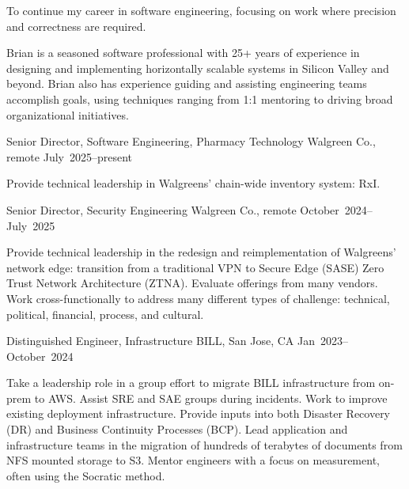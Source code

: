 \documentclass{resume}
\begin{document}
\begin{resume}
\begin{Objective}
To continue my career in software engineering, focusing on work where precision and correctness are required. 
\end{Objective}

\begin{Profile}
Brian is a seasoned software professional with 25+ years of experience
in designing and implementing horizontally scalable systems in Silicon
Valley and beyond. Brian also has experience guiding and assisting
engineering teams accomplish goals, using techniques ranging from 1:1
mentoring to driving broad organizational initiatives.
\end{Profile}

\begin{Employment}
\begin{job}{Senior Director, Software Engineering, Pharmacy Technology}
           {Walgreen Co., remote}
           {July~2025--present}

Provide technical leadership in Walgreens' chain-wide inventory system: RxI.
           
\end{job}

\begin{job}{Senior Director, Security Engineering}
           {Walgreen Co., remote}
           {October~2024--July~2025}

Provide technical leadership in the redesign and reimplementation of
Walgreens' network edge: transition from a traditional VPN to Secure
Edge (SASE) Zero Trust Network Architecture (ZTNA). Evaluate offerings
from many vendors. Work cross-functionally to address many different
types of challenge: technical, political, financial, process, and
cultural.
           
\end{job}

\begin{job}{Distinguished Engineer, Infrastructure}
           {BILL, San Jose, CA}
           {Jan~2023--October~2024}

Take a leadership role in a group effort to migrate BILL
infrastructure from on-prem to AWS. Assist SRE and SAE groups during
incidents. Work to improve existing deployment infrastructure. Provide
inputs into both Disaster Recovery (DR) and Business Continuity
Processes (BCP). Lead application and infrastructure teams in the
migration of hundreds of terabytes of documents from NFS mounted
storage to S3. Mentor engineers with a focus on measurement, often
using the Socratic method.


\end{job}
\end{Employment}
\end{resume}
\end{document}
